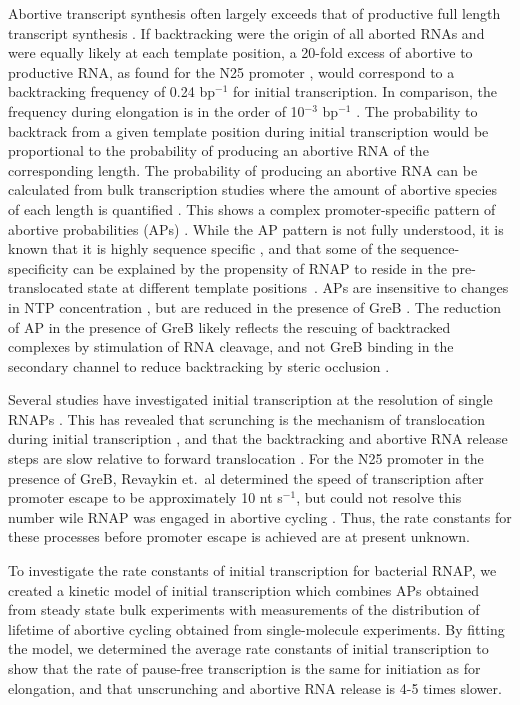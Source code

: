 Abortive transcript synthesis often largely exceeds that of productive full
length transcript synthesis \cite{carpousis_cycling_1980, hsu_initial_2006}.
If backtracking were the origin of all aborted RNAs and were equally likely at
each template position, a 20-fold excess of abortive to productive RNA, as
found for the N25 promoter \cite{hsu_initial_2006}, would correspond to a
backtracking frequency of 0.24 bp$^{-1}$ for initial transcription. In
comparison, the frequency during elongation is in the order of 10$^{-3}$
bp$^{-1}$ \cite{shaevitz_backtracking_2003}. The probability to backtrack from
a given template position during initial transcription would be proportional
to the probability of producing an abortive RNA of the corresponding length.
The probability of producing an abortive RNA can be calculated from bulk
transcription studies where the amount of abortive species of each length is
quantified \cite{hsu_quantitative_1996}. This shows a complex
promoter-specific pattern of abortive probabilities (APs)
\cite{hsu_initial_2006,hsu_vitro_2003}. While the AP pattern is not fully
understood, it is known that it is highly sequence specific
\cite{hsu_vitro_2006}, and that some of the sequence-specificity can be
explained by the propensity of RNAP to reside in the pre-translocated state at
different template positions~\cite{skancke_sequence-dependent_2015}. APs are
insensitive to changes in NTP concentration \cite{hsu_vitro_2003}, but are
reduced in the presence of GreB \cite{hsu_initial_2006}. The reduction of AP
in the presence of GreB likely reflects the rescuing of backtracked complexes
by stimulation of RNA cleavage, and not GreB binding in the secondary channel
to reduce backtracking by steric occlusion \cite{opalka_structure_2003,
hsu_initial_2006}.

Several studies have investigated initial transcription at the resolution of single
RNAPs \cite{kapanidis_retention_2005, margeat_direct_2006,
revyakin_abortive_2006, tang_real-time_2009, kapanidis_initial_2006}. This has
revealed that scrunching is the mechanism of translocation during initial
transcription \cite{revyakin_abortive_2006, kapanidis_initial_2006}, and that
the backtracking and abortive RNA release steps are slow relative to forward
translocation \cite{margeat_direct_2006, revyakin_abortive_2006}. For the N25
promoter in the presence of GreB, Revaykin et.\ al determined the speed of
transcription after promoter escape to be approximately 10 nt s$^{-1}$, but
could not resolve this number wile RNAP was engaged in abortive cycling
\cite{revyakin_abortive_2006}. Thus, the rate constants for these processes
before promoter escape is achieved are at present unknown.

To investigate the rate constants of initial transcription for bacterial RNAP,
we created a kinetic model of initial transcription which combines APs
obtained from steady state bulk experiments with measurements of the
distribution of lifetime of abortive cycling obtained from single-molecule
experiments. By fitting the model, we determined the average rate
constants of initial transcription to show that the rate of pause-free
transcription is the same for initiation as for elongation, and that
unscrunching and abortive RNA release is 4-5 times slower.
